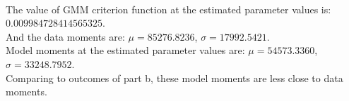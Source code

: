 \documentclass[letterpaper,12pt]{article}
\theoremstyle{definition}
\begin{document}
\begin{figure}[htb]\centering\captionsetup{width=4.0in}
  \label{Fig1c}
\end{figure}
\\
The value of GMM criterion function at the estimated parameter values is: \\
$0.009984728414565325$.\\
And the data moments are: $\mu = 85276.8236$, $\sigma = 17992.5421$.\\
Model moments at the estimated parameter values are: $\mu = 54573.3360$, $\sigma = 33248.7952$.\\
Comparing to outcomes of part b, these model moments are less close to data moments.\\
\end{document}
